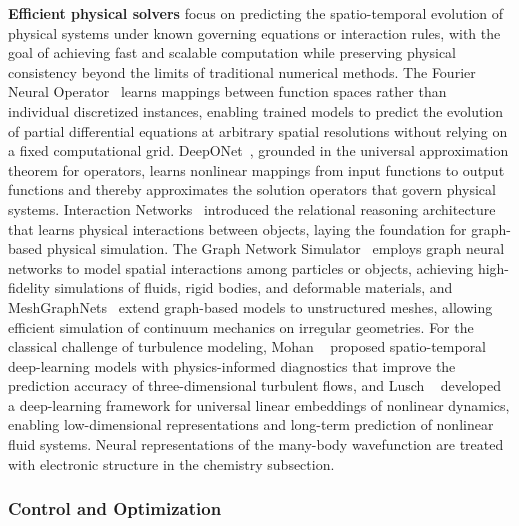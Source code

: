 \textbf{Efficient physical solvers} focus on predicting the spatio-temporal evolution of physical systems under known governing equations or interaction rules, with the goal of achieving fast and scalable computation while preserving physical consistency beyond the limits of traditional numerical methods.
The Fourier Neural Operator~\cite{li2021fourier} learns mappings between function spaces rather than individual discretized instances, enabling trained models to predict the evolution of partial differential equations at arbitrary spatial resolutions without relying on a fixed computational grid.
DeepONet~\cite{lu2021learning}, grounded in the universal approximation theorem for operators, learns nonlinear mappings from input functions to output functions and thereby approximates the solution operators that govern physical systems.
Interaction Networks~\cite{battaglia2016interaction} introduced the relational reasoning architecture that learns physical interactions between objects, laying the foundation for graph-based physical simulation.
The Graph Network Simulator~\cite{sanchez2020learning} employs graph neural networks to model spatial interactions among particles or objects, achieving high-fidelity simulations of fluids, rigid bodies, and deformable materials, and MeshGraphNets~\cite{pfaff2020learning} extend graph-based models to unstructured meshes, allowing efficient simulation of continuum mechanics on irregular geometries.
For the classical challenge of turbulence modeling, Mohan \etal~\cite{mohan2020spatio} proposed spatio-temporal deep-learning models with physics-informed diagnostics that improve the prediction accuracy of three-dimensional turbulent flows, and Lusch \etal~\cite{lusch2018deep} developed a deep-learning framework for universal linear embeddings of nonlinear dynamics, enabling low-dimensional representations and long-term prediction of nonlinear fluid systems.
Neural representations of the many-body wavefunction are treated with electronic structure in the chemistry subsection.

\subsubsection{Control and Optimization}

